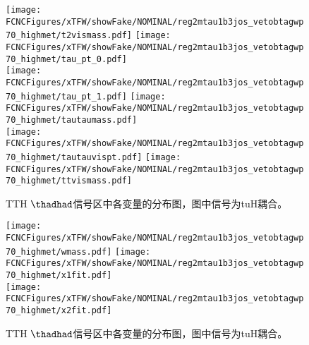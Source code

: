\begin{figure}[H]
\centering
\texttt{[image: \\FCNCFigures/xTFW/showFake/NOMINAL/reg2mtau1b3jos\_vetobtagwp70\_highmet/t2vismass.pdf]}
\texttt{[image: \\FCNCFigures/xTFW/showFake/NOMINAL/reg2mtau1b3jos\_vetobtagwp70\_highmet/tau\_pt\_0.pdf]}
\\
\texttt{[image: \\FCNCFigures/xTFW/showFake/NOMINAL/reg2mtau1b3jos\_vetobtagwp70\_highmet/tau\_pt\_1.pdf]}
\texttt{[image: \\FCNCFigures/xTFW/showFake/NOMINAL/reg2mtau1b3jos\_vetobtagwp70\_highmet/tautaumass.pdf]}
\\
\texttt{[image: \\FCNCFigures/xTFW/showFake/NOMINAL/reg2mtau1b3jos\_vetobtagwp70\_highmet/tautauvispt.pdf]}
\texttt{[image: \\FCNCFigures/xTFW/showFake/NOMINAL/reg2mtau1b3jos\_vetobtagwp70\_highmet/ttvismass.pdf]}
\\
\caption{TTH $\thadhad$信号区中各变量的分布图，图中信号为tuH耦合。}
\label{fig:var_reg2mtau1b3jos_vetobtagwp70_highmet_1}
\end{figure}
\begin{figure}[H]
\centering
\texttt{[image: \\FCNCFigures/xTFW/showFake/NOMINAL/reg2mtau1b3jos\_vetobtagwp70\_highmet/wmass.pdf]}
\texttt{[image: \\FCNCFigures/xTFW/showFake/NOMINAL/reg2mtau1b3jos\_vetobtagwp70\_highmet/x1fit.pdf]}
\\
\texttt{[image: \\FCNCFigures/xTFW/showFake/NOMINAL/reg2mtau1b3jos\_vetobtagwp70\_highmet/x2fit.pdf]}
\caption{TTH $\thadhad$信号区中各变量的分布图，图中信号为tuH耦合。}
\label{fig:var_reg2mtau1b3jos_vetobtagwp70_highmet}
\end{figure}
